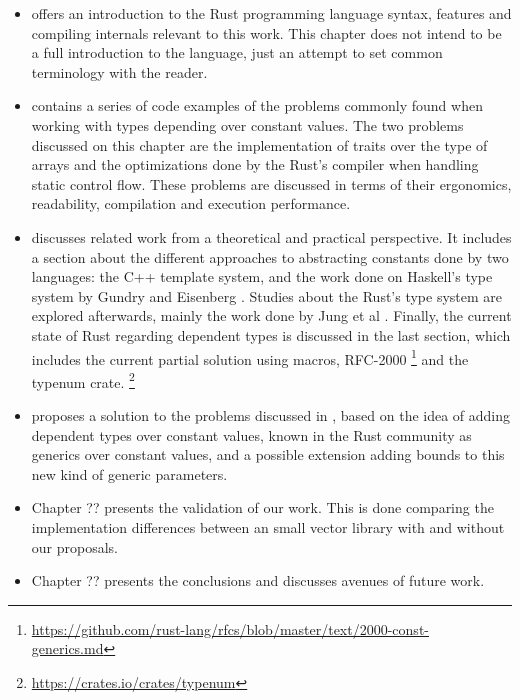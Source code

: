 \begin{itemize}
    \item {} offers an introduction to the Rust
        programming language syntax, features and compiling internals relevant
        to this work. This chapter does not intend to be a full introduction to
        the language, just an attempt to set common terminology with the
        reader.
    \item {} contains a series of code examples of the
        problems commonly found when working with types depending over constant
        values. The two problems discussed on this chapter are the
        implementation of traits over the type of arrays and the optimizations
        done by the Rust's compiler when handling static control flow. These
        problems are discussed in terms of their ergonomics, readability,
        compilation and execution performance.
    \item {} discusses related work from a theoretical
        and practical perspective. It includes a section about the
        different approaches to abstracting constants done by
        two languages: the C++ template system, and the work done on Haskell's type
        system by Gundry \cite{gundry} and Eisenberg \cite{eisenberg}. Studies
        about the Rust's type system are explored afterwards, mainly the work
        done by Jung et al \cite{ralf}. Finally, the current state of Rust
        regarding dependent types is discussed in the last section, which
        includes the current partial solution using macros, RFC-2000
        \footnote{\url{https://github.com/rust-lang/rfcs/blob/master/text/2000-const-generics.md}}
        and the typenum crate.
        \footnote{\url{https://crates.io/crates/typenum}}
    \item {} proposes a solution to the problems discussed in
        , based on the idea of adding dependent types
        over constant values, known in the Rust community as generics over
        constant values, and a possible extension adding bounds to this new
        kind of generic parameters.

    \item Chapter ?? presents the validation of our work. This is done
        comparing the implementation differences between an small vector
        library with and without our proposals.

    \item Chapter ?? presents the conclusions and discusses avenues of future
        work.
\end{itemize}
